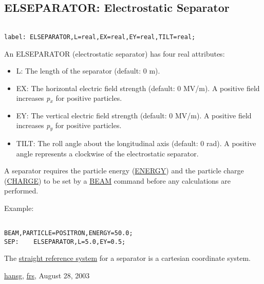 





\subsection{ELSEPARATOR: Electrostatic Separator}
\begin{verbatim}

label: ELSEPARATOR,L=real,EX=real,EY=real,TILT=real;
\end{verbatim} An ELSEPARATOR (electrostatic separator) has four real attributes: 
\begin{itemize}
	\item L: The length of the separator (default: 0 m). 
	\item EX: The horizontal electric field strength (default: 0 MV/m). A positive field increases \textit{p$_x$} for positive particles. 
	\item EY: The vertical electric field strength (default: 0 MV/m). A positive field increases \textit{p$_y$} for positive particles. 
	\item TILT: The roll angle about the longitudinal axis (default: 0 rad). A positive angle represents a clockwise of the electrostatic separator. 
\end{itemize} A separator requires the particle energy (\href{beam.html#energy}{ENERGY}) and the particle charge (\href{beam.html#charge}{CHARGE}) to be set by a \href{beam.html}{BEAM} command before any calculations are performed. 

 Example: 
\begin{verbatim}

BEAM,PARTICLE=POSITRON,ENERGY=50.0;
SEP:    ELSEPARATOR,L=5.0,EY=0.5;
\end{verbatim} The \href{local_system.html#straight}{straight reference system} for a separator is a cartesian coordinate system.  

\href{http://www.cern.ch/Hans.Grote/hansg_sign.html}{hansg}, \href{http://www.cern.ch/Frank.Schmidt/frs_sign.html}{frs}, August 28, 2003  

